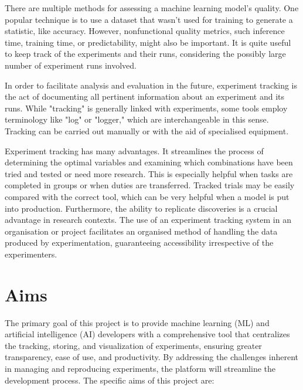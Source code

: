 \documentclass[12pt]{article}
\begin{document}
There are multiple methods for assessing a machine learning model's quality. One popular technique is to use a dataset that wasn't used for training to generate a statistic, like accuracy. However, nonfunctional quality metrics, such inference time, training time, or predictability, might also be important. It is quite useful to keep track of the experiments and their runs, considering the possibly large number of experiment runs involved.

In order to facilitate analysis and evaluation in the future, experiment tracking is the act of documenting all pertinent information about an experiment and its runs. While "tracking" is generally linked with experiments, some tools employ terminology like "log" or "logger," which are interchangeable in this sense. Tracking can be carried out manually or with the aid of specialised equipment.

Experiment tracking has many advantages. It streamlines the process of determining the optimal variables and examining which combinations have been tried and tested or need more research. This is especially helpful when tasks are completed in groups or when duties are transferred. Tracked trials may be easily compared with the correct tool, which can be very helpful when a model is put into production. Furthermore, the ability to replicate discoveries is a crucial advantage in research contexts. The use of an experiment tracking system in an organisation or project facilitates an organised method of handling the data produced by experimentation, guaranteeing accessibility irrespective of the experimenters.


\section{Aims}
The primary goal of this project is to provide machine learning (ML) and artificial intelligence (AI) developers with a comprehensive tool that centralizes the tracking, storing, and visualization of experiments, ensuring greater transparency, ease of use, and productivity. By addressing the challenges inherent in managing and reproducing experiments, the platform will streamline the development process. The specific aims of this project are:
\end{document}

